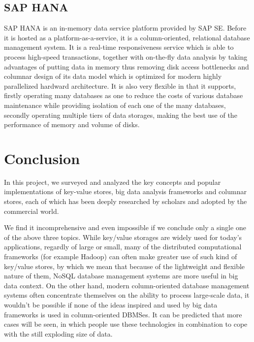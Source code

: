 \documentclass{article}
\begin{document}
\subsection{SAP HANA}

SAP HANA is an in-memory data service platform provided by SAP SE. Before it is hosted as a platform-as-a-service, it is a column-oriented, relational database management system.\cite{wiki:saphana} It is a real-time responsiveness service which is able to process high-speed transactions, together with on-the-fly data analysis by taking advantages of putting data in memory thus removing disk access bottlenecks and columnar design of its data model which is optimized for modern highly parallelized hardward architecture. It is also very flexible in that it supports, firstly operating many databases as one to reduce the costs of various database maintenance while providing isolation of each one of the many databases, secondly operating multiple tiers of data storages, making the best use of the performance of memory and volume of disks.\cite{sap-db}

\section{Conclusion}

In this project, we surveyed and analyzed the key concepts and popular implementations of key-value stores, big data analysis frameworks and columnar stores, each of which has been deeply researched by scholars and adopted by the commercial world.

We find it incomprehensive and even impossible if we conclude only a single one of the above three topics. While key/value storages are widely used for today's applications, regardly of large or small, many of the distributed computational frameworks (for example Hadoop) can often make greater use of such kind of key/value stores, by which we mean that because of the lightweight and flexible nature of them, NoSQL database management systems are more useful in big data context. On the other hand, modern column-oriented database management systems often concentrate themselves on the ability to process large-scale data, it wouldn't be possible if none of the ideas inspired and used by big data frameworks is used in column-oriented DBMSes. It can be predicted that more cases will be seen, in which people use these technologies in combination to cope with the still exploding size of data.


\nocite{*}

\end{document}
